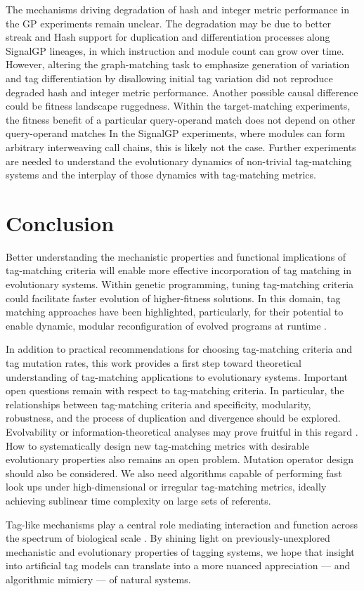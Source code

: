 The mechanisms driving degradation of hash and integer metric performance in the GP experiments remain unclear.
The degradation may be due to better streak and Hash support for duplication and differentiation processes along SignalGP lineages, in which instruction and module count can grow over time.
However, altering the graph-matching task to emphasize generation of variation and tag differentiation by disallowing initial tag variation did not reproduce degraded hash and integer metric performance.
Another possible causal difference could be fitness landscape ruggedness.
Within the target-matching experiments, the fitness benefit of a particular query-operand match does not depend on other query-operand matches
In the SignalGP experiments, where modules can form arbitrary interweaving call chains, this is likely not the case.
Further experiments are needed to understand the evolutionary dynamics of non-trivial tag-matching systems and the interplay of those dynamics with tag-matching metrics.

\section{Conclusion}

Better understanding the mechanistic properties and functional implications of tag-matching criteria will enable more effective incorporation of tag matching in evolutionary systems.
Within genetic programming, tuning tag-matching criteria could facilitate faster evolution of higher-fitness solutions.
In this domain, tag matching approaches have been highlighted, particularly, for their potential to enable dynamic, modular reconfiguration of evolved programs at runtime \citep{spector2011tag,lalejini2021tag}.

In addition to practical recommendations for choosing tag-matching criteria and tag mutation rates, this work provides a first step toward theoretical understanding of tag-matching applications to evolutionary systems.
Important open questions remain with respect to tag-matching criteria.
In particular, the relationships between tag-matching criteria and specificity, modularity, robustness, and the process of duplication and divergence should be explored.
Evolvability or information-theoretical analyses may prove fruitful in this regard \citep{tarapore2015evolvability}.
How to systematically design new tag-matching metrics with desirable evolutionary properties also remains an open problem.
Mutation operator design should also be considered.
We also need algorithms capable of performing fast look ups under high-dimensional or irregular tag-matching metrics, ideally achieving sublinear time complexity on large sets of referents.


Tag-like mechanisms play a central role mediating interaction and function across the spectrum of biological scale \citep{holland2012signals}.
By shining light on previously-unexplored mechanistic and evolutionary properties of tagging systems, we hope that insight into artificial tag models can translate into a more nuanced appreciation --- and algorithmic mimicry --- of natural systems.
